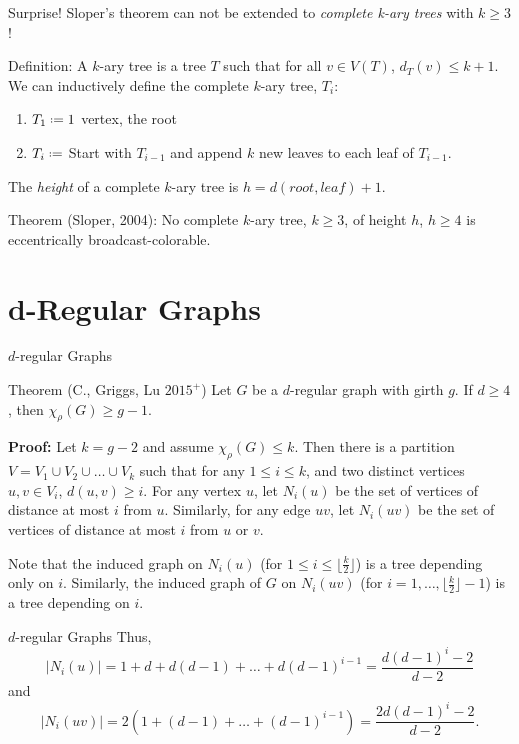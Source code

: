 \documentclass{beamer}
\newcommand*{\defeq}{\mathrel{\vcenter{\baselineskip0.5ex \lineskiplimit0pt
                     \hbox{\scriptsize.}\hbox{\scriptsize.}}}%
                     =}
\begin{document}
\begin{frame}{Surprise!}
Sloper's theorem can not be extended to {\itshape{complete k-ary trees}} with $k\geq 3$!\pause
\begin{block}{Definition:}
 A $k$-ary tree is a tree $T$ such that for all $v\in V(T)$, $d_T(v)\leq k+1$. We can inductively define the complete $k$-ary tree, $T_i$:\\
\begin{enumerate}
\item $T_1\defeq 1$ vertex, the root
\item $T_i\defeq$ Start with $T_{i-1}$ and append $k$ new leaves to each leaf of $T_{i-1}$.
\end{enumerate}
The \emph{height} of a complete $k$-ary tree is $h=d(root,leaf)+1$.
\end{block}
\pause
\begin{block}{Theorem (Sloper, 2004):}
No complete $k$-ary tree, $k\geq 3$, of height $h$, $h\geq 4$ is eccentrically broadcast-colorable.
\end{block}
\end{frame}


\section{d-Regular Graphs}

\begin{frame}{$d$-regular Graphs}
\begin{block}{Theorem (C., Griggs, Lu $2015^{+}$)}
Let $G$ be a $d$-regular graph with girth $g$.  If $d\geq 4$, then $\chi_\rho(G)\geq g-1$.
\end{block}\pause
{\bf{Proof:}} Let $k=g-2$ and assume $\chi_\rho(G)\leq k$.  Then there is a partition $V=V_1\cup V_2\cup\dots\cup V_k$ such that for any $1\leq i\leq k$, and two distinct vertices $u,v\in V_i$, $d(u,v)\geq i$.  For any vertex $u$, let $N_i(u)$ be the set of vertices of distance at most $i$ from $u$.  Similarly, for any edge $uv$, let $N_i(uv)$ be the set of vertices of distance at most $i$ from $u$ or $v$.  

Note that the induced graph on $N_i(u)$ (for $1\leq i\leq \lfloor\frac{k}{2}\rfloor$) is a tree depending only on $i$.  Similarly, the induced graph of $G$ on $N_i(uv)$ (for $i=1,\dots,\lfloor\frac{k}{2}\rfloor-1$) is a tree depending on $i$.
\end{frame}


\begin{frame}{$d$-regular Graphs}
Thus, $$\vert N_i(u)\vert=1+d+d(d-1)+\dots+d(d-1)^{i-1}=\frac{d(d-1)^i-2}{d-2}$$ and $$\vert N_i(uv)\vert =2(1+(d-1)+\dots+(d-1)^{i-1})=\frac{2d(d-1)^i-2}{d-2}.$$
\end{frame}
\end{document}
